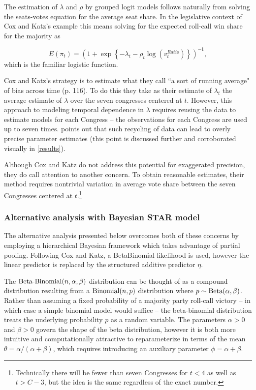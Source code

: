 The estimation of $\lambda$ and $\rho$ by grouped logit models follows naturally from 
solving the seats-votes equation for the average seat share. In the legislative context of 
Cox and Katz's example this means solving for the expected roll-call win share for the 
majority as

\begin{equation*}
  E(\pi_t)  = \left(1 + \exp{\left\{- \lambda_t - \rho_t \log{\left( v_t^{Ratio}  \right)}\right\}}\right)^{-1},
\end{equation*}
%
\noindent which is the familiar logistic function. 

Cox and Katz's strategy is to estimate what they call ``a sort of running average" of bias 
across time (p. 116). To do this they take as their estimate of $\lambda_t$ the average 
estimate of $\lambda$ over the seven congresses centered at $t$. However, this 
approach to modeling temporal dependence in $\lambda$ requires reusing the data 
to estimate models for each Congress -- the observations for each Congress are used 
up to seven times.   points out that such recycling of 
data can lead to overly precise parameter estimates (this point is discussed further and 
corroborated visually in \ref{results}). 

Although Cox and Katz do not address this potential for exaggerated precision, they do 
call attention to another  concern. To obtain reasonable estimates, their method requires 
nontrivial variation in average vote share between the seven Congresses centered at 
$t$.\footnote{Technically there will be fewer than seven Congresses for $t < 4$ as well as 
$t > C- 3$, but the idea is the same regardless of the exact number.}

\subsubsection{Alternative analysis with Bayesian STAR model}

The alternative analysis presented below overcomes both of these concerns by employing 
a hierarchical Bayesian framework which takes advantage of partial pooling. Following Cox 
and Katz, a BetaBinomial likelihood is used, however the linear predictor is replaced by the 
structured additive predictor $\eta$. 

The ${\rm Beta\text{-}Binomial}(n,\alpha,\beta)$ distribution can be thought of as a compound 
distribution resulting from a ${\rm Binomial}(n,p)$ distribution where $p \sim {\rm Beta}(\alpha,\beta)$. 
Rather than assuming a fixed probability of a majority party roll-call victory -- in which case a simple 
binomial model would suffice -- the beta-binomial distribution treats the underlying probability $p$ 
as a random variable. The parameters $\alpha > 0$ and $\beta > 0$ govern the shape of the beta distribution, 
however it is both more intuitive and computationally attractive to reparameterize in terms of the 
mean $\theta = \alpha / (\alpha + \beta)$, which requires introducing an auxiliary parameter 
$\phi = \alpha + \beta$. 

